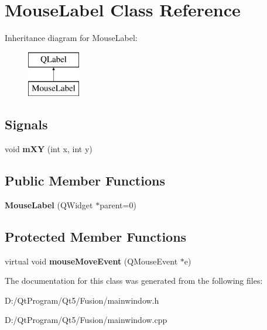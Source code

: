 \hypertarget{class_mouse_label}{}\section{Mouse\+Label Class Reference}
\label{class_mouse_label}
Inheritance diagram for Mouse\+Label\+:\begin{figure}[H]
\begin{center}
\leavevmode
\includegraphics[height=2.000000cm]{class_mouse_label}
\end{center}
\end{figure}
\subsection*{Signals}
\begin{DoxyCompactItemize}
\item 
\hypertarget{class_mouse_label_a19b8735425fefa355e5707b9ef31ff04}{}void {\bfseries m\+X\+Y} (int x, int y)\label{class_mouse_label_a19b8735425fefa355e5707b9ef31ff04}

\end{DoxyCompactItemize}
\subsection*{Public Member Functions}
\begin{DoxyCompactItemize}
\item 
\hypertarget{class_mouse_label_a9d790b509217e61306591091bafb0d3f}{}{\bfseries Mouse\+Label} (Q\+Widget $\ast$parent=0)\label{class_mouse_label_a9d790b509217e61306591091bafb0d3f}

\end{DoxyCompactItemize}
\subsection*{Protected Member Functions}
\begin{DoxyCompactItemize}
\item 
\hypertarget{class_mouse_label_a66b5f68b628a65461b1cd773ad6dad13}{}virtual void {\bfseries mouse\+Move\+Event} (Q\+Mouse\+Event $\ast$e)\label{class_mouse_label_a66b5f68b628a65461b1cd773ad6dad13}

\end{DoxyCompactItemize}


The documentation for this class was generated from the following files\+:\begin{DoxyCompactItemize}
\item 
D\+:/\+Qt\+Program/\+Qt5/\+Fusion/mainwindow.\+h\item 
D\+:/\+Qt\+Program/\+Qt5/\+Fusion/mainwindow.\+cpp\end{DoxyCompactItemize}

